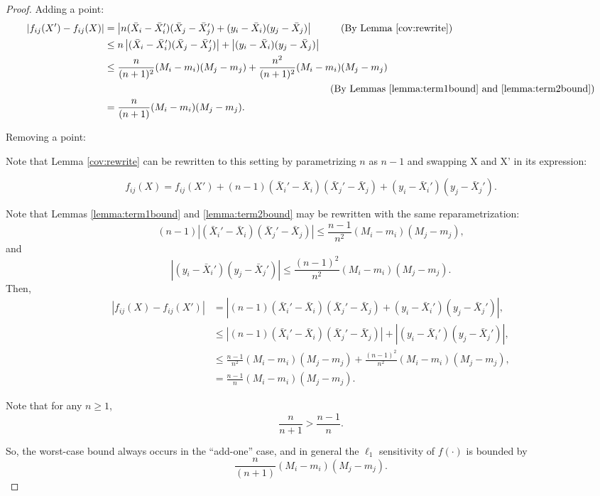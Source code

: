 \documentclass[11pt]{scrartcl} %
\begin{document}
\begin{proof}

Adding a point:
\begin{align}
\label{eq:addone}
\left\vert f_{ij}(X') - f_{ij}(X) \right\vert &= \left\vert n(\bar{X}_i - \bar{X}_i')(\bar{X}_j - \bar{X}_j') + (y_i - \bar{X}_i)(y_j - \bar{X}_j) \right\vert \hspace{1cm} \text{(By Lemma \ref{cov:rewrite})} \nonumber\\
	&\le  n \left\vert (\bar{X}_i - \bar{X}_i')(\bar{X}_j - \bar{X}_j') \right\vert + \left\vert (y_i - \bar{X}_i)(y_j - \bar{X}_j) \right\vert \nonumber\\
	&\le \frac{n}{(n+1)^2} (M_i - m_i)(M_j - m_j) + \frac{n^2}{(n+1)^2} (M_i - m_i)(M_j - m_j) \nonumber	\\
	& \hspace{8cm} \text{(By Lemmas \ref{lemma:term1bound} and \ref{lemma:term2bound})} \nonumber\\
	&= \frac{n}{(n+1)}  (M_i - m_i)(M_j - m_j).
\end{align}

Removing a point:

Note that Lemma \ref{cov:rewrite} can be rewritten to this setting by parametrizing $n$ as $n-1$ and swapping X and X' in its expression:

$$ f_{ij}(X) = f_{ij}(X') + (n-1)(\bar{X}_i' - \bar{X}_i)(\bar{X}_j' - \bar{X}_j) + (y_i - \bar{X}_i')(y_j - \bar{X}_j'). $$

Note that Lemmas \ref{lemma:term1bound} and \ref{lemma:term2bound} may be rewritten with the same reparametrization:
$$ (n-1)\left\vert (\bar{X}_i' - \bar{X}_i)(\bar{X}_j' - \bar{X}_j) \right\vert \le \frac{n-1}{n^2} (M_i - m_i)(M_j - m_j),$$
and 
$$ \left\vert (y_i - \bar{X}_i')(y_j - \bar{X}_j') \right\vert \le \frac{(n-1)^2}{n^2}(M_i - m_i)(M_j - m_j).$$
Then,
\begin{align}
\label{eq:subone}
\left\vert f_{ij}(X) - f_{ij}(X') \right\vert &= \left\vert (n-1)(\bar{X}_i' - \bar{X}_i)(\bar{X}_j' - \bar{X}_j) + (y_i - \bar{X}_i')(y_j - \bar{X}_j') \right\vert, \nonumber\\
	&\le  \left\vert (n-1)(\bar{X}_i' - \bar{X}_i)(\bar{X}_j' - \bar{X}_j) \right\vert + \left\vert(y_i - \bar{X}_i')(y_j - \bar{X}_j') \right\vert, \nonumber\\
	&\le \frac{n-1}{n^2} (M_i - m_i)(M_j - m_j) + \frac{(n-1)^2}{n^2}(M_i - m_i)(M_j - m_j), \nonumber\\
	&= \frac{n-1}{n} (M_i - m_i)(M_j - m_j).
\end{align}

Note that for any $n \ge 1$,
	\begin{equation}
	\label{ineq}
	 \frac{n}{n + 1} > \frac{n-1}{n}.
	\end{equation}

So, the worst-case bound always occurs in the ``add-one'' case, and in general the  $\ell_1$ sensitivity of $f(\cdot)$ is bounded by
 $$ \frac{n}{(n+1)}  (M_i - m_i)(M_j - m_j).$$ 
\end{proof}
\end{document}
